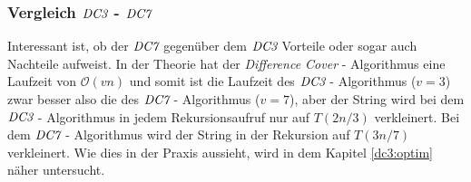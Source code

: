 \subsubsection*{Vergleich $\emph{DC3}$ - $\emph{DC7}$}

Interessant ist, ob der $\emph{DC7}$ gegenüber dem $\emph{DC3}$ Vorteile oder sogar auch Nach\-tei\-le aufweist. In der Theorie hat der \emph{Difference Cover} - Algorithmus eine Laufzeit von $\mathcal{O}(vn)$ und somit ist die Laufzeit des $\emph{DC3}$ - Algorithmus ($v = 3$) zwar besser also die des $\emph{DC7}$ - Algorithmus ($v = 7$), aber der String wird bei dem $\emph{DC3}$ - Algorithmus in jedem Rekursionsaufruf nur auf $T(2n/3)$ verkleinert. Bei dem $\emph{DC7}$ - Algorithmus wird der String in der Rekursion auf $T(3n/7)$ verkleinert. Wie dies in der Praxis aussieht, wird in dem Kapitel \ref{dc3:optim} näher untersucht.